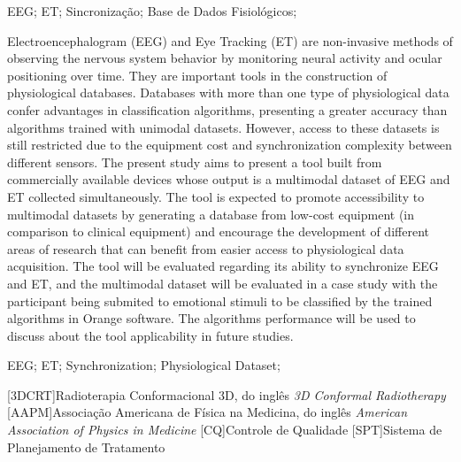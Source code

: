 \documentclass[a4paper, 12pt]{ppgeb}
\begin{document}
\vspace{14pt}

 EEG; ET; Sincronização; Base de Dados Fisiológicos;
\acresetall %
\clearpage
\restoregeometry
\acresetall %
\vspace{24pt}

Electroencephalogram (EEG) and Eye Tracking (ET) are non-invasive methods of observing the nervous system behavior 
by monitoring neural activity and ocular positioning over time. They are important tools in the construction of physiological 
databases. Databases with more than one type of physiological data confer advantages in classification algorithms, 
presenting a greater accuracy than algorithms trained with unimodal datasets. However, access to these datasets is still restricted
 due to the equipment cost and synchronization complexity between different sensors. The present study aims to present a tool built 
 from commercially available devices whose output is a multimodal dataset of EEG and ET collected simultaneously. 
 The tool is expected to promote accessibility to multimodal datasets by generating a database from
low-cost equipment (in comparison to clinical equipment) and encourage the development of different areas of research 
that can benefit from easier access to physiological data acquisition. The tool will be evaluated regarding its ability 
to synchronize EEG and ET, and the multimodal dataset will be evaluated in a case study with the participant being submited to emotional 
stimuli to be classified by the trained algorithms in Orange software. The algorithms performance will be used to discuss about the 
tool applicability in future studies.

\vspace{14pt}

 EEG; ET; Synchronization; Physiological Dataset;
\acresetall %

\indice

\begin{center}

{\bfseries{} }%
\end{center}

[3DCRT]{Radioterapia Conformacional 3D, do inglês \emph{3D Conformal Radiotherapy}}
[AAPM]{Associação Americana de Física na Medicina, do inglês \emph{American Association of Physics in Medicine}}
[CQ]{Controle de Qualidade}
[SPT]{Sistema de Planejamento de Tratamento}
\end{document}
